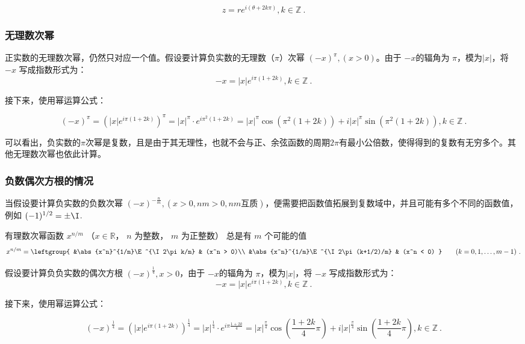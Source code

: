 \begin{equation}
z = r e^{i(\theta+2k\pi)},k\in\mathbb{Z}~.
\end{equation}

\subsubsection{无理数次幂}

正实数的无理数次幂，仍然只对应一个值。假设要计算负实数的无理数（$\pi$）次幂 $(-x)^\pi,(x>0)$。由于 $-x$的辐角为 $\pi$，模为$|x|$，将 $-x$ 写成指数形式为：
\begin{equation}
-x = |x| e^{i\pi(1+2k)},k\in\mathbb{Z}~.
\end{equation}

接下来，使用幂运算公式：

\begin{equation}
(-x)^\pi = \left( |x| e^{i\pi(1+2k)} \right)^\pi =|x|^\pi \cdot e^{i\pi^2(1+2k)}=|x|^\pi\cos(\pi^2(1+2k)) + i|x|^\pi\sin(\pi^2(1+2k)),k\in\mathbb{Z}~.
\end{equation}

可以看出，负实数的$\pi$次幂是复数，且是由于其无理性，也就不会与正、余弦函数的周期$2\pi$有最小公倍数，使得得到的复数有无穷多个。其他无理数次幂也依此计算。

\subsubsection{负数偶次方根的情况}

当假设要计算负实数的负数次幂 $\displaystyle(-x)^{-\frac{n}{m}},(x>0,nm>0,nm\text{互质})$，便需要把函数值拓展到复数域中，并且可能有多个不同的函数值， 例如 $(-1)^{1/2} = \pm\I$. 

有理数次幂函数 $x^{n/m}$ （$x\in \mathbb R$， $n$ 为整数， $m$ 为正整数） 总是有 $m$ 个可能的值
\begin{equation}
x^{n/m} = \leftgroup{
&\abs{x^n}^{1/m}\E^{\I 2\pi k/m} & (x^n > 0)\\
&\abs{x^n}^{1/m}\E^{\I 2\pi (k+1/2)/m} & (x^n < 0)
}\qquad (k = 0,1,\dots, m-1)~.
\end{equation}


假设要计算负负实数的偶次方根 $(-x)^{\frac{1}{4}},x>0$，由于 $-x$的辐角为 $\pi$，模为$|x|$，将 $-x$ 写成指数形式为：
\begin{equation}
-x = |x| e^{i\pi(1+2k)},k\in\mathbb{Z}~.
\end{equation}

接下来，使用幂运算公式：

\begin{equation}
\displaystyle
(-x)^{\frac{1}{4}} = \left( |x| e^{i\pi(1+2k)} \right)^{\frac{1}{4}} =|x|^{\frac{1}{4}} \cdot e^{i\pi\frac{1+2k}{4}}=|x|^{\frac{\pi}{4}}\cos(\frac{1+2k}{4}\pi) + i|x|^{\frac{\pi}{4}}\sin(\frac{1+2k}{4}\pi),k\in\mathbb{Z}~.
\end{equation}

